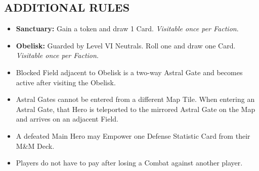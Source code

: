 \begin{multicols*}{2}
\subsection*{\MakeUppercase{Additional Rules}}
\begin{itemize}
  \item \textbf{Sanctuary:} Gain a  token and draw 1 Card. \textit{Visitable once per Faction}.
  \item \textbf{Obelisk:} Guarded by Level VI Neutrals. Roll one  and draw one Card. \textit{Visitable once per Faction}.
  \item Blocked Field adjacent to Obelisk is a two-way Astral Gate and becomes active after visiting the Obelisk.
  \item Astral Gates cannot be entered from a different Map Tile. When entering an Astral Gate, that Hero is teleported to the mirrored Astral Gate on the Map and arrives on an adjacent Field.
  \item A defeated Main Hero may Empower one Defense Statistic Card from their M\&M Deck.
  \item Players do not have to pay  after losing a Combat against another player.
\end{itemize}

\vspace*{\fill}

\end{multicols*}

